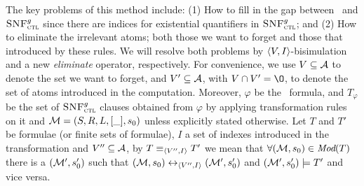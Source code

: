 \documentclass[letterpaper]{article}
\begin{document}
The key problems of this method include: (1) How to fill in  the gap between \CTL\ and ${\textsc{SNF}_{\textsc{ctl}}^g}$ since there are indices for existential quantifiers in ${\textsc{SNF}_{\textsc{ctl}}^g}$; and (2) How to eliminate the irrelevant atoms; both those we want to forget and those that introduced by these rules.
We will resolve both problems by ${\langle{V,I}\rangle}$-bisimulation and a new \emph{eliminate} operator, respectively.
For convenience, we use $V\subseteq {\cal A}$ to denote the set we want to forget, and $V' \subseteq {\cal A}$, with $V \cap V'={\O}$,  to denote the set of atoms introduced in the computation.  Moreover, $\varphi$  be the \CTL\ formula, and $T_{\varphi}$ be the set of ${\textsc{SNF}_{\textsc{ctl}}^g}$ clauses obtained from $\varphi$ by applying transformation rules on it  and ${\cal M}=(S,R,L,[\_], s_0)$ unless explicitly stated otherwise.
 Let $T$ and $T'$ be formulae (or finite sets of formulae), $I$ a set of indexes introduced in the transformation and $V''\subseteq {\cal A}$, by $T\equiv_{{\langle{V'', I}\rangle}} T'$ we mean that $\forall ({\cal M}, s_0) \in \textit{Mod}(T)$ there is a $({\cal M}', s_0')$ such that $({\cal M},s_0) \leftrightarrow_{{\langle{V'', I}\rangle}} ({\cal M}',s_0')$ and $({\cal M}', s_0') \models T'$ and vice versa.

\end{document}
